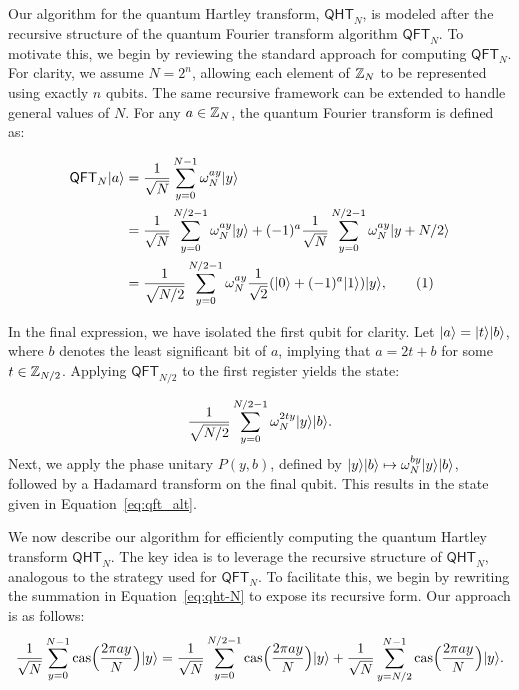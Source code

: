 \documentclass[11pt]{article}
\theoremstyle{definition}
\newcommand\numberthis{\addtocounter{equation}{1}\tag{\theequation}}
\newcommand{\cas}{\mathrm{cas}}
\newcommand{\qht}{\mathsf{QHT}}
\newcommand{\qft}{\mathsf{QFT}}
\begin{document}
Our algorithm for the quantum Hartley transform, \( \qht_N \), is modeled after the recursive structure of the quantum Fourier transform algorithm \( \qft_N \). To motivate this, we begin by reviewing the standard approach for computing \( \qft_N \). For clarity, we assume \( N = 2^n \), allowing each element of \( \mathbb{Z}_N \) to be represented using exactly \( n \) qubits. The same recursive framework can be extended to handle general values of \( N \). For any \( a \in \mathbb{Z}_N \), the quantum Fourier transform is defined as:


\begin{align*}
    \qft_N\ket{a}
    & = \frac{1}{\sqrt{N}} \sum_{y = 0}^{N - 1} \omega_N^{ay}\ket{y} \\
    & = \frac{1}{\sqrt{N}} \sum_{y = 0}^{N / 2 - 1} \omega_N^{ay} \ket{y} + (-1)^a \frac{1}{\sqrt{N}} \sum_{y = 0}^{N / 2 - 1} \omega_N^{ay} \ket{y + N/2} \\
    & = \frac{1}{\sqrt{N / 2}} \sum_{y = 0}^{N / 2 - 1} \omega_N^{ay} \frac{1}{\sqrt{2}} (\ket{0} + (-1)^a \ket{1}) \ket{y}, \numberthis\label{eq:qft_alt}
\end{align*}


In the final expression, we have isolated the first qubit for clarity. Let \( \lvert a\rangle = \lvert t\rangle\lvert b\rangle \), where \( b \) denotes the least significant bit of \( a \), implying that \( a = 2t + b \) for some \( t \in \mathbb{Z}_{N / 2} \). Applying \( \qft_{N / 2} \) to the first register yields the state:

\[ \frac{1}{\sqrt{N / 2}} \sum_{y = 0}^{N / 2 - 1} \omega_N^{2ty} \lvert y\rangle \lvert b\rangle. \]
Next, we apply the phase unitary \( P(y, b) \), defined by \( \lvert y\rangle \lvert b\rangle \mapsto \omega_N^{by} \lvert y\rangle \lvert b\rangle \), followed by a Hadamard transform on the final qubit. This results in the state given in Equation~\eqref{eq:qft_alt}.


We now describe our algorithm for efficiently computing the quantum Hartley transform \( \qht_N \). The key idea is to leverage the recursive structure of \( \qht_N \), analogous to the strategy used for \( \qft_N \). To facilitate this, we begin by rewriting the summation in Equation~\eqref{eq:qht-N} to expose its recursive form. Our approach is as follows:
\begin{equation}
    \label{eq:cas-expand}
	\frac{1}{\sqrt{N}} \sum_{y = 0}^{N - 1} \cas\Big( \frac{2\pi a y}{N} \Big) \ket{y}
    = \frac{1}{\sqrt{N}} \sum_{y = 0}^{N / 2 - 1} \cas\Big( \frac{2\pi a y}{N} \Big) \ket{y} + \frac{1}{\sqrt{N}} \sum_{y = N / 2}^{N - 1} \cas\Big( \frac{2\pi a y}{N} \Big) \ket{y}.
\end{equation}
\end{document}
